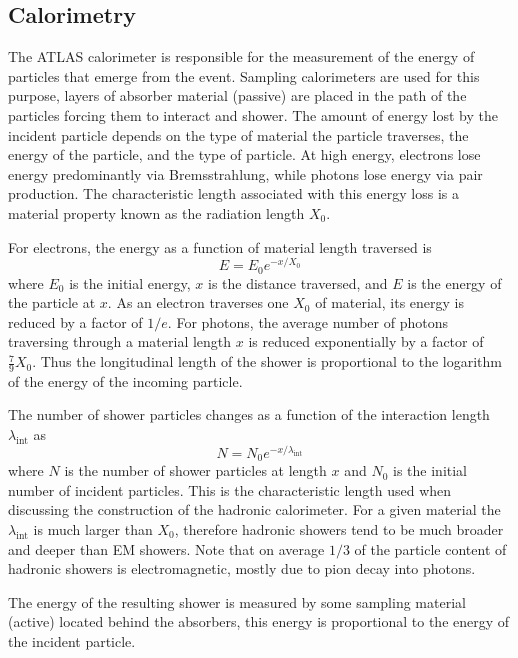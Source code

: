 \subsection{Calorimetry}
The ATLAS calorimeter is responsible for the measurement of the energy of particles that emerge from the event. Sampling calorimeters are used for this purpose, layers of absorber material (passive) are placed in the path of the particles forcing them to interact and shower. The amount of energy lost by the incident particle depends on the type of material the particle traverses, the energy of the particle, and the type of particle. At high energy, electrons lose energy predominantly via Bremsstrahlung, while photons lose energy via pair production. The characteristic length associated with this energy loss is a material property known as the radiation length $X_0$.

For electrons, the energy as a function of material length traversed is
%
\begin{equation}
  E=E_0e^{-x/X_0}
\end{equation}
%
where $E_0$ is the initial energy, $x$ is the distance traversed, and $E$ is the energy of the particle at $x$. As an electron traverses one $X_0$ of material, its energy is reduced by a factor of $1/e$. For photons, the average number of photons traversing through a material length $x$ is reduced exponentially by a factor of $\frac{7}{9}X_0$. Thus the longitudinal length of the shower is proportional to the logarithm of the energy of the incoming particle.

The number of shower particles changes as a function of the interaction length $\lambda_{\textrm{int}}$ as
%
\begin{equation}
  N=N_{0}e^{-x/\lambda_{\textrm{int}}}
\end{equation}
%
where $N$ is the number of shower particles at length $x$ and $N_{0}$ is the initial number of incident particles. This is the characteristic length used when discussing the construction of the hadronic calorimeter. For a given material the $\lambda_{\textrm{int}}$ is much larger than $X_{0}$, therefore hadronic showers tend to be much broader and deeper than EM showers. Note that on average $1/3$ of the particle content of hadronic showers is electromagnetic, mostly due to pion decay into photons.

The energy of the resulting shower is measured by some sampling material (active) located behind the absorbers, this energy is proportional to the energy of the incident particle.

